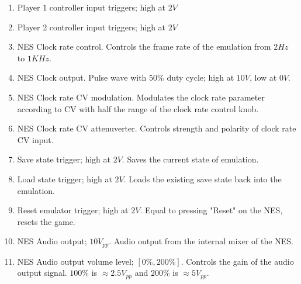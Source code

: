\documentclass[12pt,a4paper]{article}
\begin{document}
\begin{enumerate}
  \item Player 1 controller input triggers; high at $2V$
  \item Player 2 controller input triggers; high at $2V$
  \item NES Clock rate control. Controls the frame rate of the emulation from $2Hz$ to $1KHz$.
  \item NES Clock output. Pulse wave with $50\%$ duty cycle; high at $10V$, low at $0V$.
  \item NES Clock rate CV modulation. Modulates the clock rate parameter according to CV with half the range of the clock rate control knob.
  \item NES Clock rate CV attenuverter. Controls strength and polarity of clock rate CV input.
  \item Save state trigger; high at $2V$. Saves the current state of emulation.
  \item Load state trigger; high at $2V$. Loads the existing save state back into the emulation.
  \item Reset emulator trigger; high at $2V$. Equal to pressing "Reset" on the NES, resets the game.
  \item NES Audio output; $10V_{pp}$. Audio output from the internal mixer of the NES.
  \item NES Audio output volume level; $[0\%,200\%]$. Controls the gain of the audio output signal. $100\%$ is $\approx 2.5V_{pp}$ and $200\%$ is $\approx 5V_{pp}$.
\end{enumerate}


\clearpage
\renewcommand\refname{References \& Acknowledgments}
\nocite{*}


\end{document}
